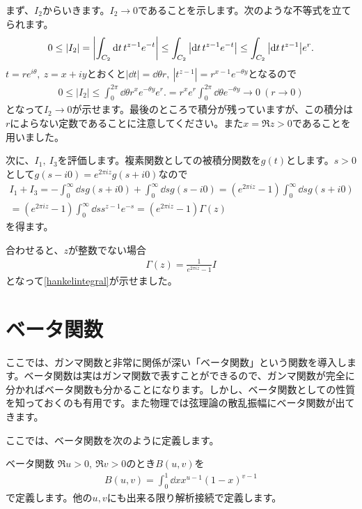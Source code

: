 \documentclass[report,paper=a4, fontsize=12pt, line_length=16cm, number_of_lines=33,dvipdfmx]{jlreq}
\numberwithin{equation}{section}
\begin{document}
まず、$I_2$からいきます。$I_2\to 0$であることを示します。次のような不等式を立てられます。
\begin{align}
  0\le |I_2|=\qty|\int_{C_2}\dd{t}t^{z-1}e^{-t}|\le
  \int_{C_2}\qty|\dd{t}t^{z-1}e^{-t}|
  \le \int_{C_2}\qty|\dd{t}t^{z-1}|e^{r}.
\end{align}
$t=re^{i\theta},\ z=x+iy$とおくと$|\dd{t}|=\dd{\theta}r,\ |t^{z-1}|=r^{x-1}e^{-\theta y}$となるので
\begin{align}
  0\le |I_2|
  \le \int_{0}^{2\pi}\dd{\theta} r^{x}e^{-\theta y}e^{r}.
  = r^{x}e^{r}\int_{0}^{2\pi}\dd{\theta} e^{-\theta y}\to 0\ (r\to 0)
\end{align}
となって$I_2\to 0$が示せます。最後のところで積分が残っていますが、この積分は$r$によらない定数であることに注意してください。また$x=\Re z>0$であることを用いました。

次に、$I_1,\ I_3$を評価します。複素関数としての被積分関数を$g(t)$とします。$s>0$として$g(s-i0)=e^{2\pi i z} g(s+i0)$なので
\begin{align}
  I_1+I_3=-\int_{0}^{\infty}\dd{s} g(s+i0)+\int_{0}^{\infty}\dd{s}g(s-i0)
  =(e^{2\pi iz}-1)\int_{0}^{\infty}\dd{s} g(s+i0)\nonumber\\
  =(e^{2\pi iz}-1)\int_{0}^{\infty}\dd{s} s^{z-1}e^{-s}
  =(e^{2\pi iz}-1)\Gamma(z)
\end{align}
を得ます。

合わせると、$z$が整数でない場合
\begin{align}
 \Gamma(z)=\frac{1}{e^{2\pi iz}-1} I
\end{align}
となって\eqref{hankelintegral}が示せました。


\section{ベータ関数}
ここでは、ガンマ関数と非常に関係が深い「ベータ関数」という関数を導入します。ベータ関数は実はガンマ関数で表すことができるので、ガンマ関数が完全に分かればベータ関数も分かることになります。しかし、ベータ関数としての性質を知っておくのも有用です。また物理では弦理論の散乱振幅にベータ関数が出てきます。

ここでは、ベータ関数を次のように定義します。
\begin{definition}{ベータ関数}{}
  $\Re u>0, \ \Re v >0$のとき$B(u,v)$を
  \begin{align}
    B(u,v)=\int_0^{1}\dd{x} x^{u-1}(1-x)^{v-1}\label{betaintegral}
  \end{align}
  で定義します。他の$u,v$にも出来る限り解析接続で定義します。
\end{definition}
\end{document}

